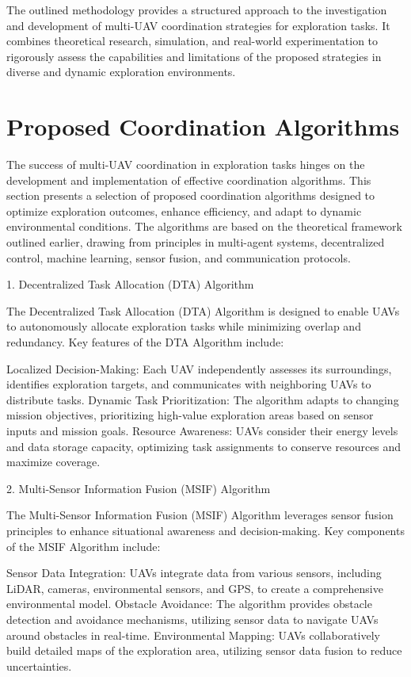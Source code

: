 \documentclass[sigconf]{acmart}
\begin{document}
The outlined methodology provides a structured approach to the investigation and development of multi-UAV coordination strategies for exploration tasks. It combines theoretical research, simulation, and real-world experimentation to rigorously assess the capabilities and limitations of the proposed strategies in diverse and dynamic exploration environments.


\section{Proposed Coordination Algorithms}
The success of multi-UAV coordination in exploration tasks hinges on the development and implementation of effective coordination algorithms. This section presents a selection of proposed coordination algorithms designed to optimize exploration outcomes, enhance efficiency, and adapt to dynamic environmental conditions. The algorithms are based on the theoretical framework outlined earlier, drawing from principles in multi-agent systems, decentralized control, machine learning, sensor fusion, and communication protocols.

1. Decentralized Task Allocation (DTA) Algorithm

The Decentralized Task Allocation (DTA) Algorithm is designed to enable UAVs to autonomously allocate exploration tasks while minimizing overlap and redundancy. Key features of the DTA Algorithm include:

    Localized Decision-Making: Each UAV independently assesses its surroundings, identifies exploration targets, and communicates with neighboring UAVs to distribute tasks.
    Dynamic Task Prioritization: The algorithm adapts to changing mission objectives, prioritizing high-value exploration areas based on sensor inputs and mission goals.
    Resource Awareness: UAVs consider their energy levels and data storage capacity, optimizing task assignments to conserve resources and maximize coverage.

2. Multi-Sensor Information Fusion (MSIF) Algorithm

The Multi-Sensor Information Fusion (MSIF) Algorithm leverages sensor fusion principles to enhance situational awareness and decision-making. Key components of the MSIF Algorithm include:

    Sensor Data Integration: UAVs integrate data from various sensors, including LiDAR, cameras, environmental sensors, and GPS, to create a comprehensive environmental model.
    Obstacle Avoidance: The algorithm provides obstacle detection and avoidance mechanisms, utilizing sensor data to navigate UAVs around obstacles in real-time.
    Environmental Mapping: UAVs collaboratively build detailed maps of the exploration area, utilizing sensor data fusion to reduce uncertainties.
\end{document}
